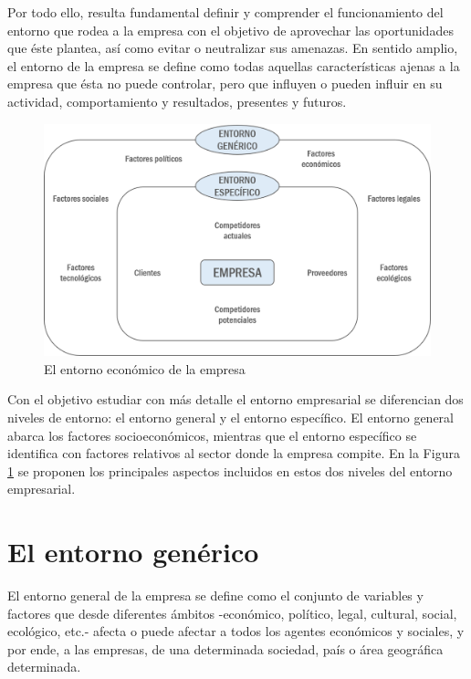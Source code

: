 \documentclass[
]{krantz}
\begin{document}
Por todo ello, resulta fundamental definir y comprender el funcionamiento del entorno que rodea a la empresa con el objetivo de aprovechar las oportunidades que éste plantea, así como evitar o neutralizar sus amenazas. En sentido amplio, el entorno de la empresa se define como todas aquellas características ajenas a la empresa que ésta no puede controlar, pero que influyen o pueden influir en su actividad, comportamiento y resultados, presentes y futuros.

\begin{figure}
\centering
\includegraphics{images/18a-01.png}
\caption{\label{fig:18a-01}El entorno económico de la empresa}
\end{figure}

Con el objetivo estudiar con más detalle el entorno empresarial se diferencian dos niveles de entorno: el entorno general y el entorno específico. El entorno general abarca los factores socioeconómicos, mientras que el entorno específico se identifica con factores relativos al sector donde la empresa compite. En la Figura \ref{fig:18a-01} se proponen los principales aspectos incluidos en estos dos niveles del entorno empresarial.

\hypertarget{el-entorno-genuxe9rico}{%
\section{El entorno genérico}\label{el-entorno-genuxe9rico}}

El entorno general de la empresa se define como el conjunto de variables y factores que desde diferentes ámbitos -económico, político, legal, cultural, social, ecológico, etc.- afecta o puede afectar a todos los agentes económicos y sociales, y por ende, a las empresas, de una determinada sociedad, país o área geográfica determinada.
\end{document}
